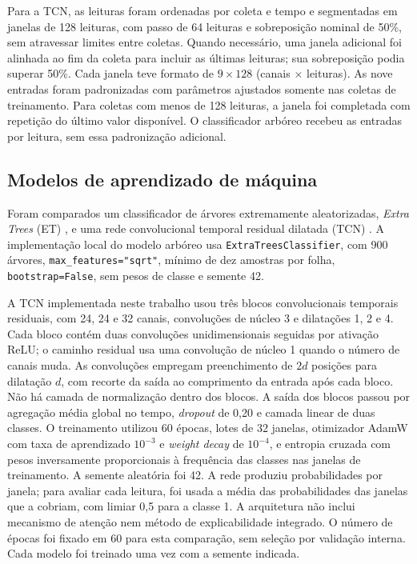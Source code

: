 Para a TCN, as leituras foram ordenadas por coleta e tempo e segmentadas
em janelas de 128 leituras, com passo de 64 leituras e sobreposição nominal
de 50\%, sem atravessar limites entre coletas. Quando necessário, uma
janela adicional foi alinhada ao fim da coleta para incluir as últimas
leituras; sua sobreposição podia superar 50\%. Cada janela teve formato de
$9\times128$ (canais $\times$ leituras). As nove entradas foram padronizadas
com parâmetros ajustados somente nas coletas de treinamento. Para coletas
com menos de 128 leituras, a janela foi completada com repetição do último
valor disponível. O classificador arbóreo recebeu as entradas por leitura,
sem essa padronização adicional.


\subsection{Modelos de aprendizado de máquina}
\label{subsec:modelos}

Foram comparados um classificador de árvores extremamente aleatorizadas,
\emph{Extra Trees} (ET) \cite{geurts2006extremely}, e uma rede convolucional
temporal residual dilatada (TCN) \cite{bai2018tcn}. A implementação local
do modelo arbóreo usa \texttt{ExtraTreesClassifier}, com 900 árvores,
\texttt{max\_features="sqrt"}, mínimo de dez amostras por folha,
\texttt{bootstrap=False}, sem pesos de classe e semente 42.

A TCN implementada neste trabalho usou três blocos convolucionais
temporais residuais, com 24, 24 e 32 canais, convoluções de núcleo 3 e
dilatações 1, 2 e 4. Cada bloco contém duas convoluções unidimensionais
seguidas por ativação ReLU; o caminho residual usa uma convolução de núcleo
1 quando o número de canais muda. As convoluções empregam preenchimento
de $2d$ posições para dilatação $d$, com recorte da saída ao comprimento
da entrada após cada bloco. Não há camada de normalização dentro dos blocos.
A saída dos blocos passou por agregação média global
no tempo, \emph{dropout} de 0,20 e camada linear de duas classes. O
treinamento utilizou 60 épocas, lotes de 32 janelas, otimizador AdamW com
taxa de aprendizado $10^{-3}$ e \emph{weight decay} de $10^{-4}$, e
entropia cruzada com pesos inversamente proporcionais à frequência das
classes nas janelas de treinamento. A semente aleatória foi 42. A rede
produziu probabilidades por janela; para avaliar cada leitura, foi usada
a média das probabilidades das janelas que a cobriam, com limiar 0,5 para
a classe 1. A arquitetura não inclui mecanismo de atenção nem método de
explicabilidade integrado. O número de épocas foi fixado em 60 para esta
comparação, sem seleção por validação interna. Cada modelo foi treinado uma
vez com a semente indicada.

